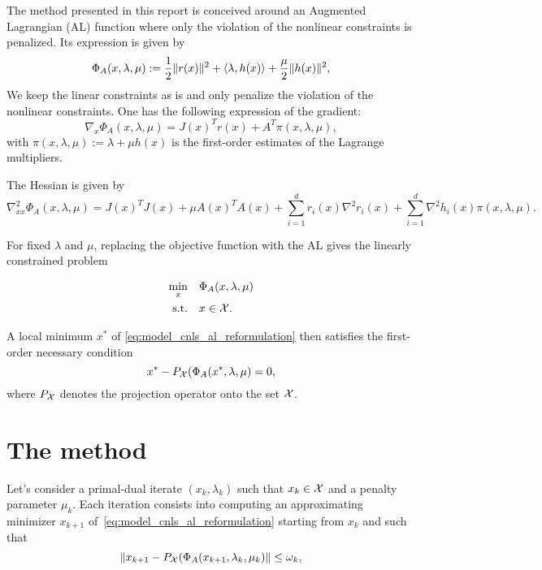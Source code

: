 \documentclass[10pt]{article}
\begin{document}
	The method presented in this report is conceived around an Augmented Lagrangian (AL) function where only the violation of the nonlinear constraints is penalized. Its expression is given by	
	\begin{equation}
		\label{eq:lsal}
		\Phi_A(x,\lambda,\mu) := \dfrac{1}{2}\|r(x)\|^2 + \left\langle {\lambda} , {h(x)} \right\rangle + \dfrac{\mu}{2} \|h(x)\|^2,
	\end{equation}
	We keep the linear constraints as is and only penalize the violation of the nonlinear constraints. 
	One has the following expression of the gradient: 
	\begin{equation}
		\label{eq:al_grad}
		\nabla_x \Phi_A(x,\lambda,\mu) = J(x)^Tr(x) + A^T\pi(x,\lambda,\mu),
	\end{equation}
	with $\pi(x,\lambda,\mu):=\lambda + \mu h(x)$ is the first-order estimates of the Lagrange multipliers. 
	
	The Hessian is given by
	\begin{equation}\label{eq:al_hessian}
		\nabla^2_{xx} \Phi_A(x,\lambda,\mu) = J(x)^TJ(x) + \mu A(x)^TA(x) +  \sum_{i=1}^d r_i(x)\nabla^2r_i(x) + \sum_{i=1}^d \nabla^2 h_i(x) \pi(x,\lambda,\mu).
	\end{equation}
	
	For fixed $\lambda$ and $\mu$, replacing the objective function with the AL gives the linearly constrained problem
	
	\begin{equation}\label{eq:model_cnls_al_reformulation} 
		\begin{aligned}
			\min_{x} \quad& \Phi_A(x,\lambda,\mu)  \\
			\text{s.t.}  \quad & x \in {\mathcal{X}}.
		\end{aligned}	
	\end{equation}
	
	A local minimum $x^*$ of \eqref{eq:model_cnls_al_reformulation} then satisfies the first-order necessary condition
	\[x^*-P_{\mathcal{X}}(\Phi_A(x^*,\lambda,\mu)=0,\]
	where $P_{\mathcal{X}}$ denotes the projection operator onto the set ${\mathcal{X}}$.
	\section{The method}
	
	Let's consider a primal-dual iterate $(x_k,\lambda_k)$ such that $x_k \in {\mathcal{X}}$ and a penalty parameter $\mu_k$. Each iteration consists into computing an approximating minimizer $x_{k+1}$ of~\eqref{eq:model_cnls_al_reformulation} starting from $x_k$ and such that
	\[\left\Vert x_{k+1}-P_{\mathcal{X}}(\Phi_A(x_{k+1},\lambda_k,\mu_k)\right\Vert \le \omega_k,\]
	
\end{document}
